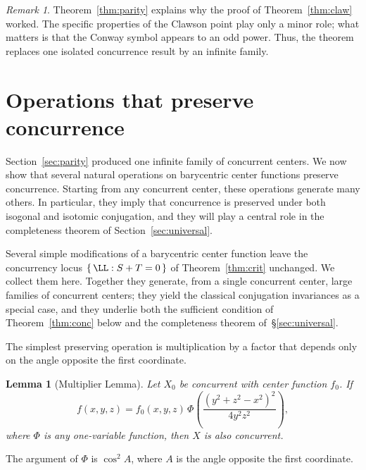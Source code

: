 \documentclass[12pt,a4paper]{amsart}
\newtheorem{lemma}[theorem]{Lemma}
\theoremstyle{remark}
\newtheorem{remark}[theorem]{Remark}
\begin{document}
\begin{remark}
Theorem~\ref{thm:parity} explains why the proof of Theorem~\ref{thm:claw} worked.
The specific properties of the Clawson point play only a minor role; what matters
is that the Conway symbol appears to an odd power.
Thus, the theorem replaces one isolated concurrence result by an infinite family.
\end{remark}

\section{Operations that preserve concurrence}
\label{sec:ops}

Section~\ref{sec:parity} produced one infinite family of concurrent centers.
We now show that several natural operations on barycentric center functions preserve
concurrence.
Starting from any concurrent center, these operations generate many others.
In particular, they imply that concurrence is preserved under both isogonal and
isotomic conjugation, and they will play a central role in the completeness theorem
of Section~\ref{sec:universal}.

Several simple modifications of a barycentric center function leave the concurrency locus
$\{\,\LL:S+T=0\,\}$ of Theorem~\ref{thm:crit} unchanged. We collect them here.
Together they generate, from a single concurrent center, large families of
concurrent centers; they yield the classical conjugation invariances as a special
case, and they underlie both the sufficient condition of
Theorem~\ref{thm:conc} below and the completeness theorem of~\S\ref{sec:universal}.

The simplest preserving operation is multiplication by a factor that depends only
on the angle opposite the first coordinate.

\begin{lemma}[Multiplier Lemma]
\label{lem:mult}
Let $X_0$ be concurrent with center function $f_0$.
If
\[
f(x,y,z)
=
f_0(x,y,z)
\,
\Phi\!\left(
\frac{(y^2+z^2-x^2)^2}{4y^2z^2}
\right),
\]
where $\Phi$ is any one-variable function,
then $X$ is also concurrent.
\end{lemma}

The argument of $\Phi$ is $\cos^{2}A$,
where $A$ is the angle opposite the first coordinate.
\end{document}

